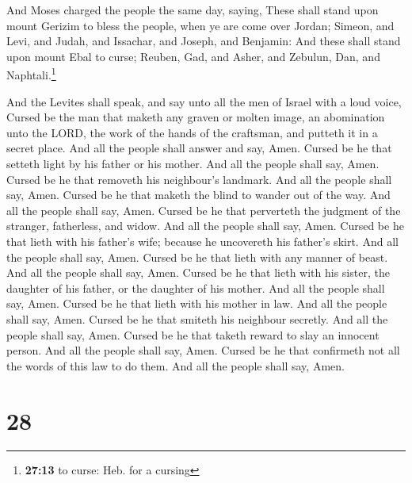  And Moses charged the people the same day, saying,
 These shall stand upon mount Gerizim to bless the
people, when ye are come over Jordan; Simeon, and Levi, and Judah, and
Issachar, and Joseph, and Benjamin:  And these shall
stand upon mount Ebal to curse; Reuben, Gad, and Asher, and Zebulun,
Dan, and Naphtali.\footnote{\textbf{27:13} to curse: Heb. for a cursing}

 And the Levites shall speak, and say unto all the men of
Israel with a loud voice,  Cursed be the man that maketh
any graven or molten image, an abomination unto the LORD, the work of
the hands of the craftsman, and putteth it in a secret place. And all
the people shall answer and say, Amen.  Cursed be he that
setteth light by his father or his mother. And all the people shall say,
Amen.  Cursed be he that removeth his neighbour's
landmark. And all the people shall say, Amen.  Cursed be
he that maketh the blind to wander out of the way. And all the people
shall say, Amen.  Cursed be he that perverteth the
judgment of the stranger, fatherless, and widow. And all the people
shall say, Amen.  Cursed be he that lieth with his
father's wife; because he uncovereth his father's skirt. And all the
people shall say, Amen.  Cursed be he that lieth with any
manner of beast. And all the people shall say, Amen. 
Cursed be he that lieth with his sister, the daughter of his father, or
the daughter of his mother. And all the people shall say, Amen.
 Cursed be he that lieth with his mother in law. And all
the people shall say, Amen.  Cursed be he that smiteth
his neighbour secretly. And all the people shall say, Amen.
 Cursed be he that taketh reward to slay an innocent
person. And all the people shall say, Amen.  Cursed be he
that confirmeth not all the words of this law to do them. And all the
people shall say, Amen.

\hypertarget{section-27}{%
\section{28}\label{section-27}}

